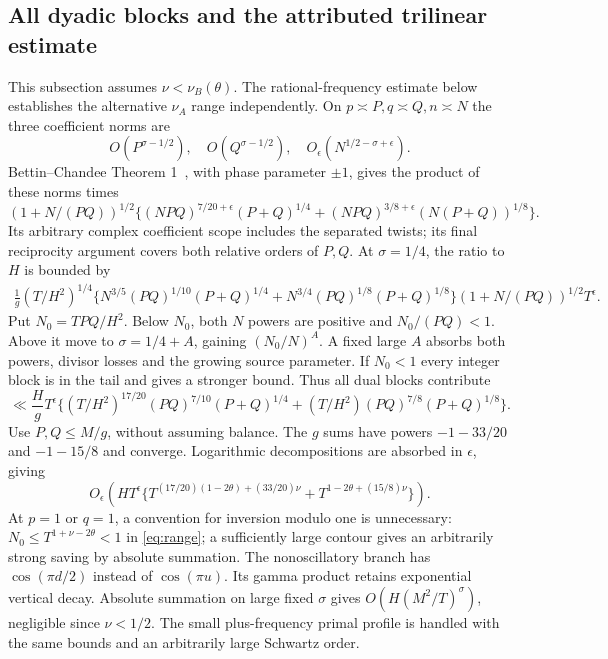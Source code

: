 \documentclass[11pt]{article}
\theoremstyle{remark}
\begin{document}
\subsection{All dyadic blocks and the attributed trilinear estimate}
This subsection assumes $\nu<\nu_B(\theta)$. The rational-frequency estimate
below establishes the alternative $\nu_A$ range independently.
On $p\asymp P,q\asymp Q,n\asymp N$ the three coefficient norms are
\[
 O(P^{\sigma-1/2}),\quad O(Q^{\sigma-1/2}),\quad
 O_\epsilon(N^{1/2-\sigma+\epsilon}).
\]
Bettin--Chandee Theorem 1~\cite{BC}, with phase parameter $\pm1$, gives
the product of these norms times
\[
 (1+N/(PQ))^{1/2}
 \{(NPQ)^{7/20+\epsilon}(P+Q)^{1/4}
 +(NPQ)^{3/8+\epsilon}(N(P+Q))^{1/8}\}.
\]
Its arbitrary complex coefficient scope includes the separated twists;
its final reciprocity argument covers both relative orders of $P,Q$.
At $\sigma=1/4$, the ratio to $H$ is bounded by
\begin{align*}
 \frac1g(T/H^2)^{1/4}
 \{N^{3/5}(PQ)^{1/10}(P+Q)^{1/4}
       +N^{3/4}(PQ)^{1/8}(P+Q)^{1/8}\}
 (1+N/(PQ))^{1/2}T^\epsilon.
\end{align*}
Put $N_0=TPQ/H^2$. Below $N_0$, both $N$ powers are positive and
$N_0/(PQ)<1$. Above it move to $\sigma=1/4+A$, gaining $(N_0/N)^A$.
A fixed large $A$ absorbs both powers, divisor losses and the growing
source parameter. If $N_0<1$ every integer block is in the tail and gives
a stronger bound. Thus all dual blocks contribute
\[
 \ll\frac Hg T^\epsilon
 \{(T/H^2)^{17/20}(PQ)^{7/10}(P+Q)^{1/4}
       +(T/H^2)(PQ)^{7/8}(P+Q)^{1/8}\}.
\]
Use $P,Q\le M/g$, without assuming balance. The $g$ sums have powers
$-1-33/20$ and $-1-15/8$ and converge. Logarithmic decompositions are
absorbed in $\epsilon$, giving
\begin{equation}\label{eq:newerror}
 O_\epsilon\left(HT^\epsilon
 \{T^{(17/20)(1-2\theta)+(33/20)\nu}
                  +T^{1-2\theta+(15/8)\nu}\}\right).
\end{equation}
At $p=1$ or $q=1$, a convention for inversion modulo one is unnecessary:
$N_0\le T^{1+\nu-2\theta}<1$ in \eqref{eq:range}; a sufficiently large
contour gives an arbitrarily strong saving by absolute summation.
The nonoscillatory branch has $\cos(\pi d/2)$ instead of $\cos(\pi u)$.
Its gamma product retains exponential vertical decay. Absolute summation
on large fixed $\sigma$ gives $O(H(M^2/T)^\sigma)$, negligible since
$\nu<1/2$. The small plus-frequency primal profile is handled with the
same bounds and an arbitrarily large Schwartz order.
\end{document}
